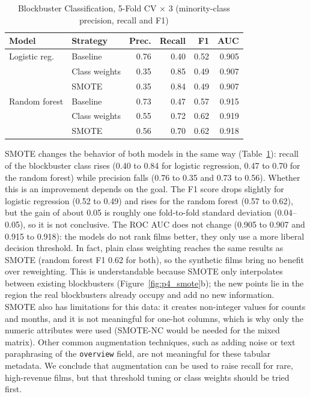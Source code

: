 \documentclass[conference]{IEEEtran}
\begin{document}
\begin{table}[t]
\caption{Blockbuster Classification, 5-Fold CV $\times$ 3 (minority-class precision, recall and F1)}
\label{tab:p4_aug}
\centering
\scriptsize
\setlength{\tabcolsep}{3pt}
\begin{tabular}{llrrrr}
\toprule
Model & Strategy & Prec. & Recall & F1 & AUC \\
\midrule
Logistic reg. & Baseline & 0.76 & 0.40 & 0.52 & 0.905 \\
 & Class weights & 0.35 & 0.85 & 0.49 & 0.907 \\
 & SMOTE & 0.35 & 0.84 & 0.49 & 0.907 \\
\midrule
Random forest & Baseline & 0.73 & 0.47 & 0.57 & 0.915 \\
 & Class weights & 0.55 & 0.72 & 0.62 & 0.919 \\
 & SMOTE & 0.56 & 0.70 & 0.62 & 0.918 \\
\bottomrule
\end{tabular}
\end{table}

SMOTE changes the behavior of both models in the same way (Table~\ref{tab:p4_aug}): recall of the blockbuster class rises (0.40 to 0.84 for logistic
regression, 0.47 to 0.70 for the random forest) while precision falls (0.76 to 0.35 and 0.73 to 0.56). Whether this is an improvement depends on the goal.
The F1 score drops slightly for logistic regression (0.52 to 0.49) and rises for the random forest (0.57 to 0.62), but the gain of about 0.05 is
roughly one fold-to-fold standard deviation (0.04--0.05), so it is not conclusive. The ROC AUC does not change (0.905 to 0.907 and 0.915 to 0.918): the models do not rank films better,
they only use a more liberal decision threshold. In fact, plain class weighting reaches the same results as SMOTE (random forest F1 0.62 for both),
so the synthetic films bring no benefit over reweighting. This is understandable because SMOTE only interpolates between existing blockbusters
(Figure~\ref{fig:p4_smote}b); the new points lie in the region the real blockbusters already occupy and add no new information. SMOTE also has limitations for this
data: it creates non-integer values for counts and months, and it is not meaningful for one-hot columns, which is why only the numeric attributes
were used (SMOTE-NC would be needed for the mixed matrix). Other common augmentation techniques, such as adding noise or text paraphrasing of the \texttt{overview} field,
are not meaningful for these tabular metadata. We conclude that augmentation can be used to raise recall for rare, high-revenue films, but
that threshold tuning or class weights should be tried first.
\end{document}
